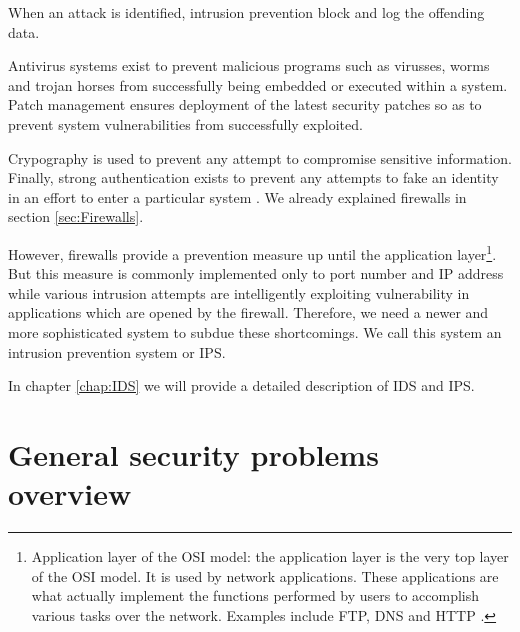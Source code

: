 When an attack is identified, intrusion prevention block and log the offending data.

Antivirus systems exist to prevent malicious programs such as virusses, worms and trojan horses from successfully being embedded or executed within a system. Patch management ensures deployment of the latest security patches so as to prevent system vulnerabilities from successfully exploited.

Crypography is used to prevent any attempt to compromise sensitive information. Finally, strong authentication exists to prevent any attempts to fake an identity in an effort to enter a particular system \citep{76}. We already explained firewalls in section \ref{sec:Firewalls}.

However, firewalls provide a prevention measure up until the application layer\footnote{Application layer of the OSI model: the application layer is the very top layer of the OSI model. It is used by network applications. These applications are what actually implement the functions performed by users to accomplish various tasks over the network. Examples include FTP, DNS and HTTP \citep{osi}.}. But this measure is commonly implemented only to port number and IP address while various intrusion attempts are intelligently exploiting vulnerability in applications which are opened by the firewall. Therefore, we need a newer and more sophisticated system to subdue these shortcomings. We call this system an intrusion prevention system or IPS.

In chapter \ref{chap:IDS} we will provide a detailed description of IDS and IPS. 

\section{General security problems overview}

